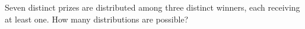 Seven distinct prizes are distributed among three distinct winners, each receiving at least one. How many distributions are possible?
